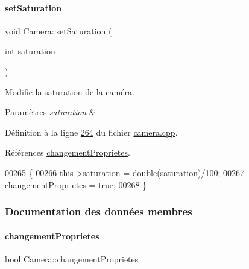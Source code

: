 \paragraph{\texorpdfstring{set\+Saturation}{setSaturation}}
{\footnotesize\ttfamily void Camera\+::set\+Saturation (\begin{DoxyParamCaption}\item[{int}]{saturation }\end{DoxyParamCaption})\hspace{0.3cm}{\ttfamily [slot]}}



Modifie la saturation de la caméra. 


\begin{DoxyParams}{Paramètres}
{\em saturation} & \\
\hline
\end{DoxyParams}


Définition à la ligne \hyperlink{camera_8cpp_source_l00264}{264} du fichier \hyperlink{camera_8cpp_source}{camera.\+cpp}.



Références \hyperlink{camera_8h_source_l00070}{changement\+Proprietes}.


\begin{DoxyCode}
00265 \{
00266     this->\hyperlink{class_camera_afd46d6d2451ee33b68dbc74713f2687c}{saturation} = double(\hyperlink{class_camera_afd46d6d2451ee33b68dbc74713f2687c}{saturation})/100;
00267     \hyperlink{class_camera_a50d2b3ef5c08f8b61bbe2115d71005bd}{changementProprietes} = \textcolor{keyword}{true};
00268 \}
\end{DoxyCode}


\subsubsection{Documentation des données membres}
\mbox{\label{class_camera_a50d2b3ef5c08f8b61bbe2115d71005bd}} 
\paragraph{\texorpdfstring{changement\+Proprietes}{changementProprietes}}
{\footnotesize\ttfamily bool Camera\+::changement\+Proprietes\hspace{0.3cm}{\ttfamily [private]}}



